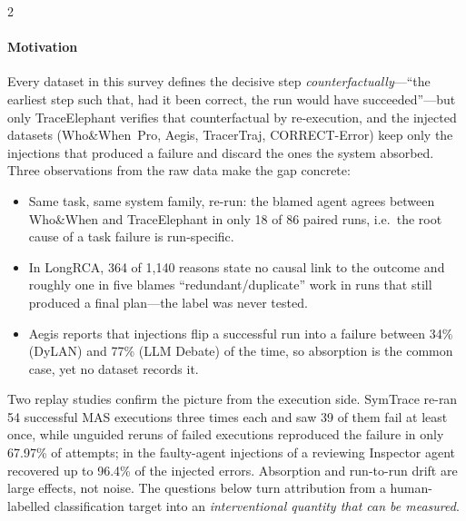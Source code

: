 \begin{multicols}{2}
\paragraph{Motivation} Every dataset in this survey defines the decisive step \emph{counterfactually}---``the earliest step such that, had it been correct, the run would have succeeded''---but only TraceElephant verifies that counterfactual by re-execution, and the injected datasets (Who\&When~Pro, Aegis, TracerTraj, CORRECT-Error) keep only the injections that produced a failure and discard the ones the system absorbed. Three observations from the raw data make the gap concrete:
\begin{itemize}[leftmargin=1.1em]
\item Same task, same system family, re-run: the blamed agent agrees between Who\&When and TraceElephant in only 18 of 86 paired runs, i.e.\ the root cause of a task failure is run-specific.
\item In LongRCA, 364 of 1,140 reasons state no causal link to the outcome and roughly one in five blames ``redundant/duplicate'' work in runs that still produced a final plan---the label was never tested.
\item Aegis reports that injections flip a successful run into a failure between 34\% (DyLAN) and 77\% (LLM Debate) of the time, so absorption is the common case, yet no dataset records it.
\end{itemize}
Two replay studies confirm the picture from the execution side. SymTrace \cite{luan2026symtrace} re-ran 54 successful MAS executions three times each and saw 39 of them fail at least once, while unguided reruns of failed executions reproduced the failure in only 67.97\% of attempts; in the faulty-agent injections of \citet{huang2024resilience} a reviewing Inspector agent recovered up to 96.4\% of the injected errors. Absorption and run-to-run drift are large effects, not noise. The questions below turn attribution from a human-labelled classification target into an \emph{interventional quantity that can be measured}.


\end{multicols}
